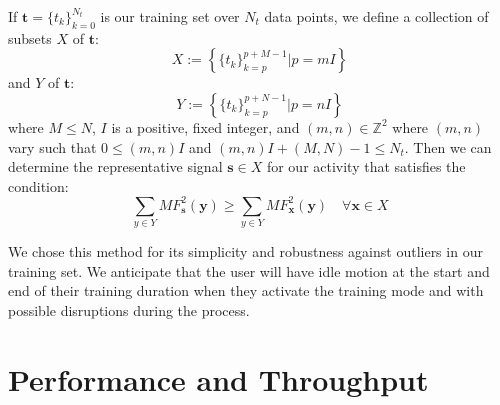 \documentclass[journal]{IEEEtran}
\begin{document}
If $\textbf{t} = \{t_k\}_{k=0}^{N_t}$ is our training set over $N_t$ data points, we define a collection of subsets $X$ of $\textbf{t}$:
%
\begin{equation} \label{eq:X_subsets_of_training_eq}
X := \left \{ \{t_k\}_{k=p}^{p+M-1} | p=mI \right \}
\end{equation}
%
and $Y$ of $\textbf{t}$:
%
\begin{equation} \label{eq:Y_subsets_of_training_eq}
Y := \left \{ \{t_k\}_{k=p}^{p+N-1} | p=nI \right \}
\end{equation}
%
where $M \leq N$, $I$ is a positive, fixed integer, and $(m,n) \in \mathbb{Z}^2$ where $(m,n)$ vary such that $0 \leq (m,n)I$ and $(m,n)I + (M,N) - 1 \leq N_t$. Then we can determine the representative signal $\textbf{s} \in X$ for our activity that satisfies the condition:
%
\begin{equation} \label{eq:s_condition}
\sum_{y \in Y}MF^2_{\textbf{s}}(\textbf{y}) \geq \sum_{y \in Y}MF^2_{\textbf{x}}(\textbf{y}) \quad \forall \textbf{x} \in X
\end{equation}

We chose this method for its simplicity and robustness against outliers in our training set. We anticipate that the user will have idle motion at the start and end of their training duration when they activate the training mode and with possible disruptions during the process.
%
\section{Performance and Throughput}
%
\end{document}
